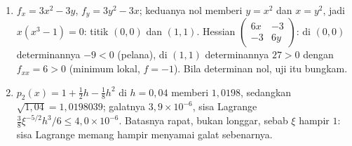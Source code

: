 \begin{enumerate}[label=\textbf{12.\arabic*}]
  \item $f_{x}=3x^{2}-3y$, $f_{y}=3y^{2}-3x$; keduanya nol memberi $y=x^{2}$ dan
        $x=y^{2}$, jadi $x(x^{3}-1)=0$: titik $(0,0)$ dan $(1,1)$. Hessian
        $\begin{pmatrix}6x&-3\\-3&6y\end{pmatrix}$: di $(0,0)$ determinannya
        $-9<0$ (pelana), di $(1,1)$ determinannya $27>0$ dengan $f_{xx}=6>0$
        (minimum lokal, $f=-1$). Bila determinan nol, uji itu bungkam.

  \item $p_{2}(x)=1+\tfrac12h-\tfrac18h^{2}$ di $h=0{,}04$ memberi $1{,}0198$,
        sedangkan $\sqrt{1{,}04}=1{,}0198039$; galatnya
        $3{,}9\times10^{-6}$, sisa Lagrange
        $\frac{3}{8}\xi^{-5/2}h^{3}/6\le4{,}0\times10^{-6}$. Batasnya rapat, bukan longgar, sebab $\xi$
        hampir $1$: sisa Lagrange memang hampir menyamai galat sebenarnya.
\end{enumerate}

